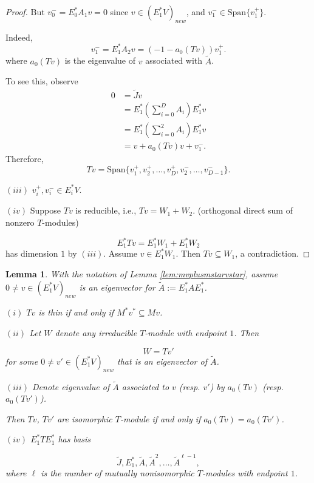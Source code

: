 \documentclass[
]{book}
\newtheorem{lemma}{Lemma}[chapter]
\theoremstyle{definition}
\theoremstyle{definition}
\theoremstyle{definition}
\theoremstyle{definition}
\theoremstyle{remark}
\begin{document}
\begin{proof}
But \(v^-_0 = E^*_0A_1v = 0\) since \(v\in (E^*_1V)_{new}\), and \(v^-_1\in \mathrm{Span}\{v^+_1\}\).

Indeed,
\[v^-_1 = E^*_1A_2v = (-1-a_0(Tv))v^+_1.\]
where \(a_0(Tv)\) is the eigenvalue of \(v\) associated with \(\tilde{A}\).

To see this, observe
\begin{align}
0 & = \tilde{J}v\\
& = E^*_1\left(\sum_{i=0}^DA_i\right)E^*_1v\\
& = E^*_1\left(\sum_{i=0}^2A_i\right)E^*_1v\\
& = v + a_0(Tv)v + v^-_1.
\end{align}
Therefore,
\[Tv = \mathrm{Span}\{v^+_1, v^+_2, \ldots, v^+_D, v_2^-, \ldots, v^-_{D-1}\}.\]

\((iii)\) \(v^+_i, v^-_i\in E^*_iV\).

\((iv)\) Suppose \(Tv\) is reducible, i.e., \(Tv = W_1 + W_2\). (orthogonal direct sum of nonzero \(T\)-modules)

\[E^*_1Tv = E^*_1W_1 + E^*_1W_2\]
has dimension \(1\) by \((iii)\). Assume \(v\in E^*_1W_1\). Then \(Tv \subseteq W_1\), a contradiction.

\end{proof}

\begin{lemma}
\protect\hypertarget{lem:tv-thin}{}\label{lem:tv-thin}With the notation of Lemma \ref{lem:mvplusmstarvstar}, assume \(0\neq v\in (E^*_1V)_{new}\) is an eigenvector for \(\tilde{A}:=E^*_1AE^*_1\).

\((i)\) \(Tv\) is thin if and only if \(M^*v^* \subseteq Mv\).

\((ii)\) Let \(W\) denote any irreducible \(T\)-module with endpoint \(1\). Then

\[W = Tv'\]
for some \(0\neq v'\in (E^*_1V)_{new}\) that is an eigenvector of \(\tilde{A}\).

\((iii)\) Denote eigenvalue of \(\tilde{A}\) associated to \(v\) (resp. \(v'\)) by \(a_0(Tv)\) (resp. \(a_0(Tv')\)).

Then \(Tv\), \(Tv'\) are isomorphic \(T\)-module if and only if \(a_0(Tv) = a_0(Tv')\).

\((iv)\) \(E^*_1TE^*_1\) has basis

\[\tilde{J}, E^*_1, \tilde{A}, \tilde{A}^2, \ldots, \tilde{A}^{\ell-1},\]
where \(\ell\) is the number of mutually nonisomorphic \(T\)-modules with endpoint \(1\).
\end{lemma}
\end{document}
